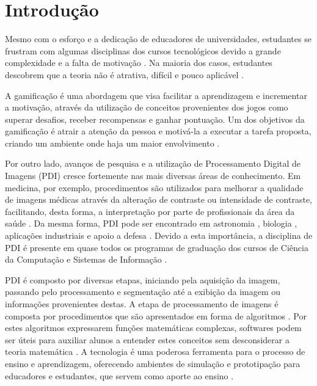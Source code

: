 \documentclass[
	12pt,				%
	oneside,			%
	a4paper,			%
	english,			%
	french,				%
	spanish,			%
	brazil,				%
	]{abntex2}
\begin{document}
\tableofcontents*
\cleardoublepage


\textual

\chapter{Introdução}

Mesmo com o esforço e a dedicação de educadores de universidades, estudantes se frustram com algumas disciplinas dos cursos tecnológicos devido a grande complexidade e a falta de motivação \cite{garcia2015colfdimap}. Na maioria dos casos, estudantes descobrem que a teoria não é atrativa, difícil e pouco aplicável \cite{zin2015transforming}.

A gamificação é uma abordagem que visa facilitar a aprendizagem e incrementar a motivação, através da utilização de conceitos provenientes dos jogos como superar desafios, receber recompensas e ganhar pontuação. Um dos objetivos da gamificação é atrair a atenção da pessoa e motivá-la a executar a tarefa proposta, criando um ambiente onde haja um maior envolvimento \cite{kaap:2014}.   

Por outro lado, avanços de pesquisa e a  utilização de Processamento Digital de Imagens (PDI) cresce fortemente nas mais diversas áreas de conhecimento. Em medicina, por exemplo, procedimentos são utilizados para melhorar a qualidade de imagens médicas através da alteração de contraste ou intensidade de contraste, facilitando, desta forma, a interpretação por parte de profissionais da área da saúde \cite{ronnau2015}. Da mesma forma, PDI pode ser encontrado em astronomia \cite{grice20153d}, biologia \cite{hardy2017advanced}, aplicações industriais \cite{dai2015advances} e apoio a defesa \cite{mendoza2016development}. Devido a esta importância, a disciplina de PDI é presente em quase todos os programas de graduação dos cursos de Ciência da Computação e Sistemas de Informação \cite{garcia2015colfdimap}.

PDI é composto por diversas etapas, iniciando pela aquisição da imagem, passando pelo processamento e segmentação até a exibição da imagem ou informações provenientes destas. A etapa de processamento de imagens é composta por procedimentos que são apresentados em forma de algoritmos \cite{gonzalesWoods:2008}. Por estes algoritmos expressarem funções matemáticas complexas, softwares podem ser úteis para auxiliar alunos a entender estes conceitos sem desconsiderar a teoria matemática \cite{lopez2016teaching}. A tecnologia é uma poderosa ferramenta para o processo de ensino e aprendizagem, oferecendo ambientes de simulação e prototipação para educadores e estudantes, que servem como aporte ao ensino \cite{henderson2017works}.
\end{document}
